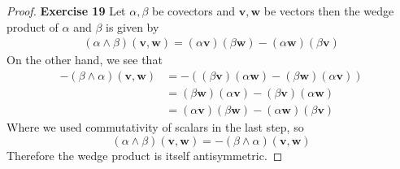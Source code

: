 \documentclass[11pt]{article}
\theoremstyle{definition}
\begin{document}
\begin{proof}{\textbf{Exercise 19}}
    Let $\alpha, \beta$ be covectors and $\bm{v},\bm{w}$ be vectors then the
    wedge product of $\alpha$ and $\beta$ is given by
    \begin{align*}
        (\alpha \wedge\beta)(\bm{v}, \bm{w})
        = (\alpha\bm{v})(\beta\bm{w}) - (\alpha\bm{w})(\beta\bm{v}) 
    \end{align*}
    On the other hand, we see that
    \begin{align*}
        -(\beta \wedge\alpha)(\bm{v}, \bm{w})
        &= -((\beta\bm{v})(\alpha\bm{w}) - (\beta\bm{w})(\alpha\bm{v}))\\
        &= (\beta\bm{w})(\alpha\bm{v}) -(\beta\bm{v})(\alpha\bm{w})\\
        &= (\alpha\bm{v})(\beta\bm{w}) -(\alpha\bm{w})(\beta\bm{v})
    \end{align*}
    Where we used commutativity of scalars in the last step, so
    $$(\alpha \wedge\beta)(\bm{v}, \bm{w}) = -(\beta \wedge\alpha)(\bm{v}, \bm{w})$$
    Therefore the wedge product is itself antisymmetric.
\end{proof}
\cleardoublepage
\end{document}
